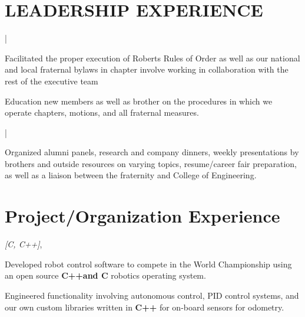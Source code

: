 \documentclass[letterpaper]{deedy-resume}
\begin{document}
\begin{minipage}[t]{0.69\textwidth}
\sectionspace

\section{LEADERSHIP EXPERIENCE}

 |

\begin{tightitemize}
\item Facilitated the proper execution of Roberts Rules of Order as well as our national and local fraternal bylaws in chapter involve working in collaboration with the rest of the executive team
\item Education new members as well as brother on the procedures in which we operate chapters, motions, and all fraternal measures.
\end{tightitemize}

\sectionspace

 |

\begin{tightitemize}
\item Organized alumni panels, research and company dinners, weekly presentations by brothers and outside resources on varying topics, resume/career fair preparation, as well as a liaison between the fraternity and College of Engineering.
\end{tightitemize}


\sectionspace 

\section{Project/Organization Experience}

 \emph{[C, C++]}, \\
\begin{tightitemize}
\item Developed robot control software to compete in the World Championship using an open source \textbf{C++and C} robotics operating system. 
\item Engineered functionality involving autonomous control, PID control systems, and our own custom libraries written in \textbf{C++} for on-board sensors for odometry.
\end{tightitemize}
\sectionspace 


\end{minipage}
\end{document}
